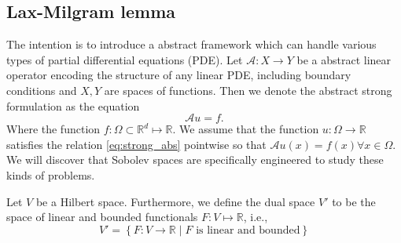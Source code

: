 



\subsection{Lax-Milgram lemma}%
\label{sub:lax_milgram_lemma}

The intention is to introduce a abstract framework which can handle various types of partial differential equations (PDE). Let  $\mathcal{A} : X \to Y $ be a abstract linear operator encoding the structure of any linear PDE, including boundary
conditions and $X,Y$ are spaces of functions. Then we denote the abstract strong formulation as the equation
\begin{equation}
\label{eq:strong_abs}
\mathcal{A} u = f.
\end{equation}
Where the function $f: \Omega \subset \mathbb{R}^d \mapsto \mathbb{R}$. We assume that the function $u: \Omega \rightarrow \mathbb{R}$ satisfies the relation \eqref{eq:strong_abs} pointwise so that $\mathcal{A} u(x)=f(x) \forall x \in \Omega$.
We will discover that Sobolev spaces are specifically engineered to study these kinds of problems.

\begin{definition}
    \label{def:linear_function}
Let $V$ be a Hilbert space. Furthermore, we define the dual space $V' $ to be the space of linear and bounded functionals $F: V  \mapsto \mathbb{R} $, i.e., \[
V'  = \left\{ F: V \to \mathbb{R}   \mid  F \text{ is linear and bounded} \right\}
\]
\end{definition}


